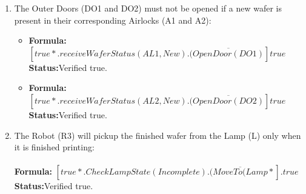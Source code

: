 \documentclass[a4paper,12pt]{article}
\begin{document}
\begin{enumerate}
\item The Outer Doors (DO1 and DO2) must not be opened if a new wafer is present in their corresponding Airlocks (A1 and A2):
\begin{itemize}
	\item \textbf{Formula:} $[true*.receiveWaferStatus(AL1,New).(\overline{OpenDoor(DO1)}]true$ 
	\\\textbf{Status:}Verified true.
    \item \textbf{Formula:} $[true*.receiveWaferStatus(AL2,New).(\overline{OpenDoor(DO2)}]true$  
    \\\textbf{Status:}Verified true.
	\end{itemize}


\item The Robot (R3) will pickup the finished wafer from the Lamp (L) only when it is finished printing:
\\
\\\textbf{Formula:} $[true*.CheckLampState(Incomplete).(\overline{MoveTo(Lamp}*].true$ \\\textbf{Status:}Verified true.




\end{enumerate}
\end{document}
